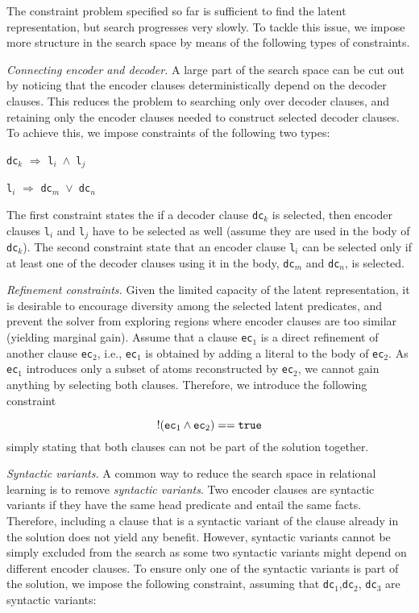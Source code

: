 The constraint problem specified so far is sufficient to find the latent representation, but search progresses very slowly.
To tackle this issue, we impose more structure in the search space by means of the following types of constraints.

\textit{Connecting encoder and decoder.}
A large part of the search space can be cut out by noticing that the encoder clauses deterministically depend on the decoder clauses.
This reduces the problem to searching only over decoder clauses, and retaining only the encoder clauses needed to construct selected decoder clauses.
To achieve this, we impose constraints of the following two types:
\begin{center}
	\texttt{dc}$_k$ $\Rightarrow$ \texttt{l$_i$ $\wedge$  l$_j$}
    
    \texttt{l}$_i$ $\Rightarrow$ \texttt{dc$_m$ $\vee$ dc$_n$}
\end{center}
The first constraint states the if a decoder clause \texttt{dc}$_k$ is selected, then encoder clauses \texttt{l$_i$} and \texttt{l$_j$} have to be selected as well (assume they are used in the body of \texttt{dc}$_k$).
The second constraint state that an encoder clause \texttt{l}$_i$ can be selected only if at least one of the decoder clauses using it in the body, \texttt{dc$_m$} and \texttt{dc$_n$}, is selected.


\textit{Refinement constraints.} 
Given the limited capacity of the latent representation, it is desirable to encourage diversity among the selected latent predicates, and prevent the solver from exploring regions where encoder clauses are too similar (yielding marginal gain).
Assume that a clause \texttt{ec}$_1$ is a direct refinement of another clause \texttt{ec}$_2$, i.e., \texttt{ec}$_1$ is obtained by adding a literal to the body of \texttt{ec}$_2$.
As \texttt{ec}$_1$ introduces only a subset of atoms reconstructed by \texttt{ec}$_2$, we cannot gain anything by selecting both clauses. 
Therefore, we introduce the following constraint

$$ !(\text{\texttt{ec}}_1 \wedge \text{\texttt{ec}}_2) == \text{\texttt{true}} $$
simply stating that both clauses can not be part of the solution together.



\textit{Syntactic variants.}
A common way to reduce the search space in relational learning is to remove \textit{syntactic variants}.
Two encoder clauses are syntactic variants if they have the same head predicate and entail the same facts.
Therefore, including a clause that is a syntactic variant of the clause already in the solution does not yield any benefit.
However, syntactic variants cannot be simply excluded from the search as some two syntactic variants might depend on different encoder clauses.
To ensure only one of the syntactic variants is part of the solution, we impose the following constraint, assuming that \texttt{dc}$_1$,\texttt{dc}$_2$, \texttt{dc}$_3$ are syntactic variants:

